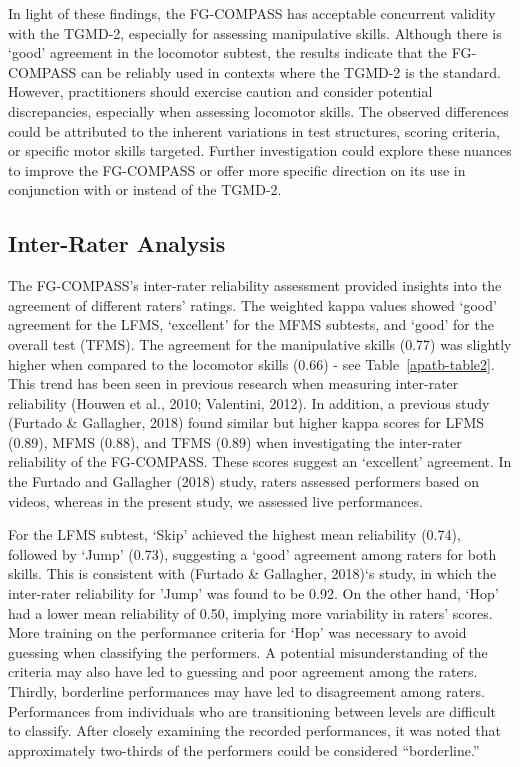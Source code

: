 \documentclass[
  man,
  colorlinks=true,linkcolor=blue,citecolor=blue,urlcolor=blue]{apa7}
\begin{document}
In light of these findings, the FG-COMPASS has acceptable concurrent
validity with the TGMD-2, especially for assessing manipulative skills.
Although there is `good' agreement in the locomotor subtest, the results
indicate that the FG-COMPASS can be reliably used in contexts where the
TGMD-2 is the standard. However, practitioners should exercise caution
and consider potential discrepancies, especially when assessing
locomotor skills. The observed differences could be attributed to the
inherent variations in test structures, scoring criteria, or specific
motor skills targeted. Further investigation could explore these nuances
to improve the FG-COMPASS or offer more specific direction on its use in
conjunction with or instead of the TGMD-2.

\hypertarget{inter-rater-analysis}{%
\subsection{Inter-Rater Analysis}\label{inter-rater-analysis}}

The FG-COMPASS's inter-rater reliability assessment provided insights
into the agreement of different raters' ratings. The weighted kappa
values showed `good' agreement for the LFMS, `excellent' for the MFMS
subtests, and `good' for the overall test (TFMS). The agreement for the
manipulative skills (0.77) was slightly higher when compared to the
locomotor skills (0.66) - see Table~\ref{apatb-table2}. This trend has
been seen in previous research when measuring inter-rater reliability
(Houwen et al., 2010; Valentini, 2012). In addition, a previous study
(Furtado \& Gallagher, 2018) found similar but higher kappa scores for
LFMS (0.89), MFMS (0.88), and TFMS (0.89) when investigating the
inter-rater reliability of the FG-COMPASS. These scores suggest an
`excellent' agreement. In the Furtado and Gallagher (2018) study, raters
assessed performers based on videos, whereas in the present study, we
assessed live performances.

For the LFMS subtest, `Skip' achieved the highest mean reliability
(0.74), followed by `Jump' (0.73), suggesting a `good' agreement among
raters for both skills. This is consistent with (Furtado \& Gallagher,
2018)`s study, in which the inter-rater reliability for 'Jump' was found
to be 0.92. On the other hand, `Hop' had a lower mean reliability of
0.50, implying more variability in raters' scores. More training on the
performance criteria for `Hop' was necessary to avoid guessing when
classifying the performers. A potential misunderstanding of the criteria
may also have led to guessing and poor agreement among the raters.
Thirdly, borderline performances may have led to disagreement among
raters. Performances from individuals who are transitioning between
levels are difficult to classify. After closely examining the recorded
performances, it was noted that approximately two-thirds of the
performers could be considered ``borderline.''
\end{document}
